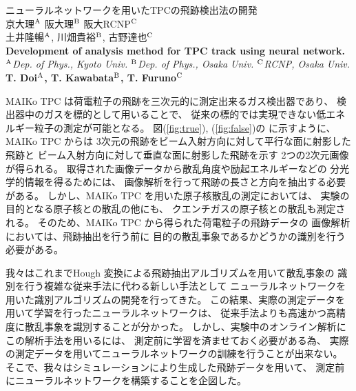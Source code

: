 \documentclass[12pt,a4paper]{jsarticle}
\begin{document}
\vspace{-5pt}
\begin{center}
  {\gt \Large ニューラルネットワークを用いたTPCの飛跡検出法の開発 }\\[14pt]
  
  {\gt \large 京大理$^{\rm{A}}$ 阪大理$^{\rm{B}}$ 阪大RCNP$^{\rm{C}}$\\
    土井隆暢$^{\rm{A}}$, 川畑貴裕$^{\rm{B}}$, 古野達也$^{\rm{C}}$}\\[5pt]
  
  {\large \bf Development of analysis method for TPC track using neural network.}\\[5pt]
  
  {\large \it $^{\rm{A}}$Dep. of Phys., Kyoto Univ. $^{\rm{B}}$Dep. of Phys., Osaka Univ.
    $^{\rm{C}}$RCNP, Osaka Univ.}\\
  
  {\large \bf T. Doi$^{\rm{A}}$, T. Kawabata$^{\rm{B}}$, T. Furuno$^{\rm{C}}$}
\end{center}

\vspace{5pt}
\small
MAIKo TPC%
は荷電粒子の飛跡を三次元的に測定出来るガス検出器であり、
検出器中のガスを標的として用いることで、
従来の標的では実現できない低エネルギー粒子の測定が可能となる。
図(\ref{fig:true}), (\ref{fig:false})の%
に示すように、MAIKo TPC からは
3次元の飛跡をビーム入射方向に対して平行な面に射影した飛跡と
ビーム入射方向に対して垂直な面に射影した飛跡を示す
2つの2次元画像が得られる。
取得された画像データから散乱角度や励起エネルギーなどの
分光学的情報を得るためには、
画像解析を行って飛跡の長さと方向を抽出する必要がある。
しかし、MAIKo TPC を用いた原子核散乱の測定においては、
実験の目的となる原子核との散乱の他にも、
クエンチガスの原子核との散乱も測定される。
そのため、MAIKo TPC から得られた荷電粒子の飛跡データの
画像解析においては、飛跡抽出を行う前に
目的の散乱事象であるかどうかの識別を行う必要がある。

我々はこれまでHough 変換による飛跡抽出アルゴリズムを用いて散乱事象の
識別を行う複雑な従来手法に代わる新しい手法として
ニューラルネットワークを用いた識別アルゴリズムの開発を行ってきた。
この結果、実際の測定データを用いて学習を行ったニューラルネットワークは、
従来手法よりも高速かつ高精度に散乱事象を識別することが分かった。
しかし、実験中のオンライン解析にこの解析手法を用いるには、
測定前に学習を済ませておく必要がある為、
実際の測定データを用いてニューラルネットワークの訓練を行うことが出来ない。
そこで、我々はシミュレーションにより生成した飛跡データを用いて、
測定前にニューラルネットワークを構築することを企図した。
\end{document}
